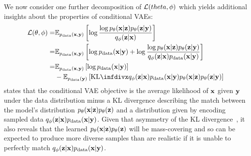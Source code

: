 We now consider one further decomposition of ${\mathcal{L}}(theta, \phi)$ which yields additional insights about the properties of conditional VAEs:
\begin{align}
    \gL(\theta, \phi) =& \EX_{\pdata(\rvx,\rvy)} \left[ \log \frac{\log p_\theta(\rvx|\rvz)p_\theta(\rvz|\rvy)}{q_\phi(\rvz|\rvx)} \right] \\
    =& \EX_{\pdata(\rvx,\rvy)} \left[ \log \pdata(\rvx|\rvy) + \log \frac{\log p_\theta(\rvx|\rvz)p_\theta(\rvz|\rvy)}{q_\phi(\rvz|\rvx)\pdata(\rvx|\rvy)} \right] \\
    \label{eq:elbo-kl-joints}
    =& \EX_{\pdata(\rvx,\rvy)} \left[ \log \pdata(\rvx|\rvy) \right] \\
    &- \EX_{\pdata(\rvy)} \left[ \kl{q_\phi(\rvz|\rvx)\pdata(\rvx|\rvy)}{p_\theta(\rvx|\rvz)p_\theta(\rvz|\rvy)} \right] \nonumber
\end{align}
 states that the conditional VAE objective is the average likelihood of ${\mathbf{x}}$ given ${\mathbf{y}}$ under the data distribution minus a KL divergence describing the match between the model's distribution $p_\theta({\mathbf{x}}|{\mathbf{z}})p_\theta({\mathbf{z}})$ and a distribution given by encoding sampled data $q_\phi({\mathbf{z}}|{\mathbf{x}})p_{\rm{data}}({\mathbf{x}}|{\mathbf{y}})$. Given that asymmetry of the KL divergence~\citep{bishop2006pattern}, it also reveals that the learned $p_\theta({\mathbf{x}}|{\mathbf{z}})p_\theta({\mathbf{z}})$ will be mass-covering and so can be expected to produce more diverse samples than are realistic if it is unable to perfectly match $q_\phi({\mathbf{z}}|{\mathbf{x}})p_{\rm{data}}({\mathbf{x}}|{\mathbf{y}})$.

